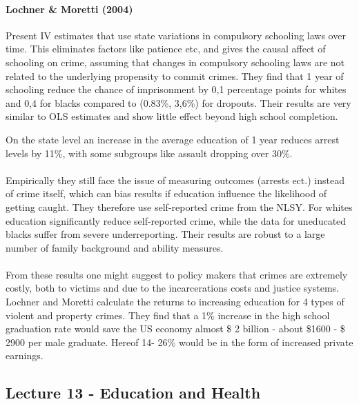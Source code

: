 \documentclass[12pt, a4paper]{article}
\begin{document}
\begin{multicols}{2}
\paragraph{Lochner \& Moretti (2004)} Present IV estimates that use state variations in compulsory schooling laws over time. This eliminates factors like patience etc, and gives the causal affect of schooling on crime, assuming that changes in compulsory schooling laws are not related to the underlying propensity to commit crimes. They find that 1 year of schooling reduce the chance of imprisonment by 0,1 percentage points for whites and 0,4 for blacks compared to (0.83\%, 3,6\%) for dropouts. Their results are very similar to OLS estimates and show little effect beyond high school completion.

On the state level an increase in the average education of 1 year reduces arrest levels by 11\%, with some subgroups like assault dropping over 30\%.
\\ \\
Empirically they still face the issue of measuring outcomes (arrests ect.) instead of crime itself, which can bias results if education influence the likelihood of getting caught. They therefore use self-reported crime from the NLSY. For whites education significantly reduce self-reported crime, while the data for uneducated blacks suffer from severe underreporting. Their results are robust to a large number of family background and ability measures.
\\ \\
From these results one might suggest to policy makers that crimes are extremely costly, both to victims and due to the incarcerations costs and justice systems. Lochner and Moretti calculate the returns to increasing education for 4 types of violent and property crimes. They find that a 1\% increase in the high school graduation rate would save the US economy almost \$ 2 billion - about \$1600 - \$ 2900 per male graduate. Hereof 14- 26\% would be in the form of increased private earnings.


\subsection{Lecture 13 - Education and Health}

\end{multicols}
\end{document}
